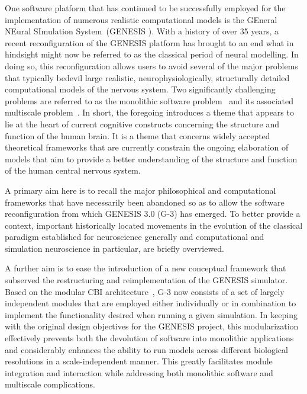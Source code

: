 \documentclass[10pt,letterpaper]{article}
\begin{document}
One software platform that has continued to be successfully employed for the implementation of numerous realistic computational models is the GEneral NEural SImulation System~(GENESIS \cite{bower03,Wilson:1988zr}). With a history of over 35 years, a recent reconfiguration of the GENESIS platform has brought to an end what in hindsight might now be referred to as the classical period of neural modelling. In doing so, this reconfiguration allows users to avoid several of the major problems that typically bedevil large realistic, neurophysiologically, structurally detailed computational models of the nervous system. Two significantly challenging problems are referred to as the monolithic software problem~\cite{cornelis08:_cbi_archit_comput_simul_realis} and its associated multiscale problem~\cite{cornelis12}. In short, the foregoing introduces a theme that appears to lie at the heart of current cognitive constructs concerning the structure and function of the human brain. It is a theme that concerns widely accepted theoretical frameworks that are currently constrain the ongoing elaboration of models that aim to provide a better understanding of the structure and function of the human central nervous system.

A primary aim here is to recall the major philosophical and computational frameworks that have necessarily been abandoned so as to allow the software reconfiguration from which GENESIS 3.0 (G-3) has emerged. To better provide a context, important historically located movements in the evolution of the classical paradigm established for neuroscience generally and computational and simulation neuroscience in particular, are briefly overviewed.

A further aim is to ease the introduction of a new conceptual framework that subserved the restructuring and reimplementation of the GENESIS simulator. Based on the modular CBI architecture~\cite{cornelis12}, G-3 now consists of a set of largely independent modules that are employed either individually or in combination to implement the functionality desired when running a given simulation. In keeping with the original design objectives for the GENESIS project, this modularization effectively prevents both the devolution of software into monolithic applications and considerably enhances the ability to run models across different biological resolutions in a scale-independent manner. This greatly facilitates module integration and interaction while addressing both monolithic software and multiscale complications.
\end{document}

